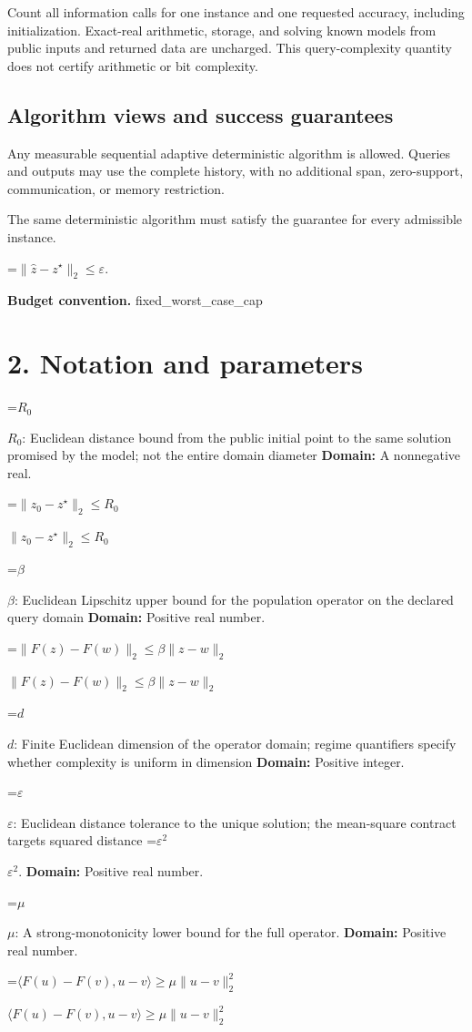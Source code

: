\documentclass[10pt,a4paper]{article}
\newcommand{\AtlasMath}[1]{\par\begingroup\centering\setbox0=\hbox{$\displaystyle #1$}\ifdim\wd0>1.4\linewidth\typeout{ATLAS WIDE FORMULA: \the\wd0}\fi\ifdim\wd0>\linewidth\resizebox{\linewidth}{!}{\box0}\else\box0\fi\par\endgroup}
\newcommand{\AtlasInlineMath}[1]{\begingroup\setbox0=\hbox{$#1$}\ifdim\wd0>.4\linewidth\endgroup\AtlasMath{#1}\else\endgroup$#1$\fi}
\begin{document}
Count all information calls for one instance and one requested accuracy, including initialization. Exact-real arithmetic, storage, and solving known models from public inputs and returned data are uncharged. This query-complexity quantity does not certify arithmetic or bit complexity.

\subsection{Algorithm views and success guarantees}
Any measurable sequential adaptive deterministic algorithm is allowed. Queries and outputs may use the complete history, with no additional span, zero-support, communication, or memory restriction.

The same deterministic algorithm must satisfy the guarantee for every admissible instance.


\AtlasMath{\|\widehat{z}-z^\star\|_2\le\varepsilon.}


\textbf{Budget convention.} fixed\_worst\_case\_cap

\section{2. Notation and parameters}
\AtlasInlineMath{R_0}: Euclidean distance bound from the public initial point to the same solution promised by the model; not the entire domain diameter \textbf{Domain:} A nonnegative real.

\AtlasInlineMath{\|z_0-z^\star\|_2\le R_0}

\AtlasInlineMath{\beta}: Euclidean Lipschitz upper bound for the population operator on the declared query domain \textbf{Domain:} Positive real number.

\AtlasInlineMath{\|F(z)-F(w)\|_2\le\beta\|z-w\|_2}

\AtlasInlineMath{d}: Finite Euclidean dimension of the operator domain; regime quantifiers specify whether complexity is uniform in dimension \textbf{Domain:} Positive integer.

\AtlasInlineMath{\varepsilon}: Euclidean distance tolerance to the unique solution; the mean-square contract targets squared distance \AtlasInlineMath{\varepsilon^2}. \textbf{Domain:} Positive real number.

\AtlasInlineMath{\mu}: A strong-monotonicity lower bound for the full operator. \textbf{Domain:} Positive real number.

\AtlasInlineMath{\langle F(u)-F(v),u-v\rangle\ge\mu\|u-v\|_2^2}
\end{document}
